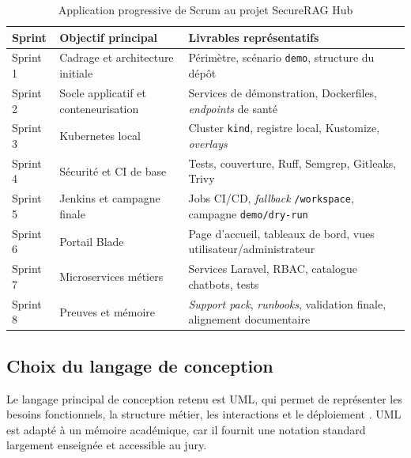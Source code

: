 \begin{table}[htbp]
    \centering
    \begin{tabular}{|p{2.2cm}|p{5.2cm}|p{6.2cm}|}
        \hline
        \textbf{Sprint} & \textbf{Objectif principal} & \textbf{Livrables représentatifs} \\
        \hline
        Sprint 1 & Cadrage et architecture initiale & Périmètre, scénario \texttt{demo}, structure du dépôt \\
        \hline
        Sprint 2 & Socle applicatif et conteneurisation & Services de démonstration, Dockerfiles, \textit{endpoints} de santé \\
        \hline
        Sprint 3 & Kubernetes local & Cluster \texttt{kind}, registre local, Kustomize, \textit{overlays} \\
        \hline
        Sprint 4 & Sécurité et CI de base & Tests, couverture, Ruff, Semgrep, Gitleaks, Trivy \\
        \hline
        Sprint 5 & Jenkins et campagne finale & Jobs CI/CD, \textit{fallback} \texttt{/workspace}, campagne \texttt{demo/dry-run} \\
        \hline
        Sprint 6 & Portail Blade & Page d'accueil, tableaux de bord, vues utilisateur/administrateur \\
        \hline
        Sprint 7 & Microservices métiers & Services Laravel, RBAC, catalogue chatbots, tests \\
        \hline
        Sprint 8 & Preuves et mémoire & \textit{Support pack}, \textit{runbooks}, validation finale, alignement documentaire \\
        \hline
    \end{tabular}
    \caption{Application progressive de Scrum au projet SecureRAG Hub}
    \label{tab:sprints_securerag}
\end{table}

\subsection{Choix du langage de conception}

Le langage principal de conception retenu est UML, qui permet de représenter les besoins fonctionnels, la structure métier, les interactions et le déploiement \cite{omg_uml_2_5}. UML est adapté à un mémoire académique, car il fournit une notation standard largement enseignée et accessible au jury.

